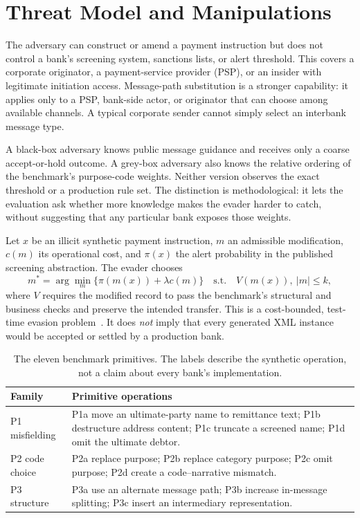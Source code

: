 \documentclass[conference]{IEEEtran}
\begin{document}
\section{Threat Model and Manipulations}
The adversary can construct or amend a payment instruction but does not control
a bank's screening system, sanctions lists, or alert threshold. This covers a
corporate originator, a payment-service provider (PSP), or an insider with
legitimate initiation access. Message-path substitution is a stronger
capability: it applies only to a PSP, bank-side actor, or originator that can
choose among available channels. A typical corporate sender cannot simply
select an interbank message type.

A black-box adversary knows public message guidance and receives only a coarse
accept-or-hold outcome. A grey-box adversary also knows the relative ordering
of the benchmark's purpose-code weights. Neither version observes the exact
threshold or a production rule set. The distinction is methodological: it
lets the evaluation ask whether more knowledge makes the evader harder to
catch, without suggesting that any particular bank exposes those weights.

Let $x$ be an illicit synthetic payment instruction, $m$ an admissible
modification, $c(m)$ its operational cost, and $\pi(x)$ the alert probability
in the published screening abstraction. The evader chooses
\begin{equation}
 m^*=\arg\min_m\{\pi(m(x))+\lambda c(m)\}
 \quad\text{s.t.}\quad V(m(x)),\ |m|\leq k,
 \label{eq:evader}
\end{equation}
where $V$ requires the modified record to pass the benchmark's structural and
business checks and preserve the intended transfer. This is a cost-bounded,
test-time evasion problem~\cite{bruckner2011,biggio2013}. It does \emph{not}
imply that every generated XML instance would be accepted or settled by a
production bank.

\begin{table}[!t]
\caption{The eleven benchmark primitives. The labels describe the synthetic
operation, not a claim about every bank's implementation.}
\label{tab:taxonomy}
\centering
\scriptsize
\begin{tabularx}{\columnwidth}{@{}lX@{}}
\toprule
Family & Primitive operations \\
\midrule
P1 misfielding & P1a move an ultimate-party name to remittance text; P1b
destructure address content; P1c truncate a screened name; P1d omit the
ultimate debtor. \\
P2 code choice & P2a replace purpose; P2b replace category purpose; P2c omit
purpose; P2d create a code--narrative mismatch. \\
P3 structure & P3a use an alternate message path; P3b increase in-message
splitting; P3c insert an intermediary representation. \\
\bottomrule
\end{tabularx}
\end{table}
\end{document}
